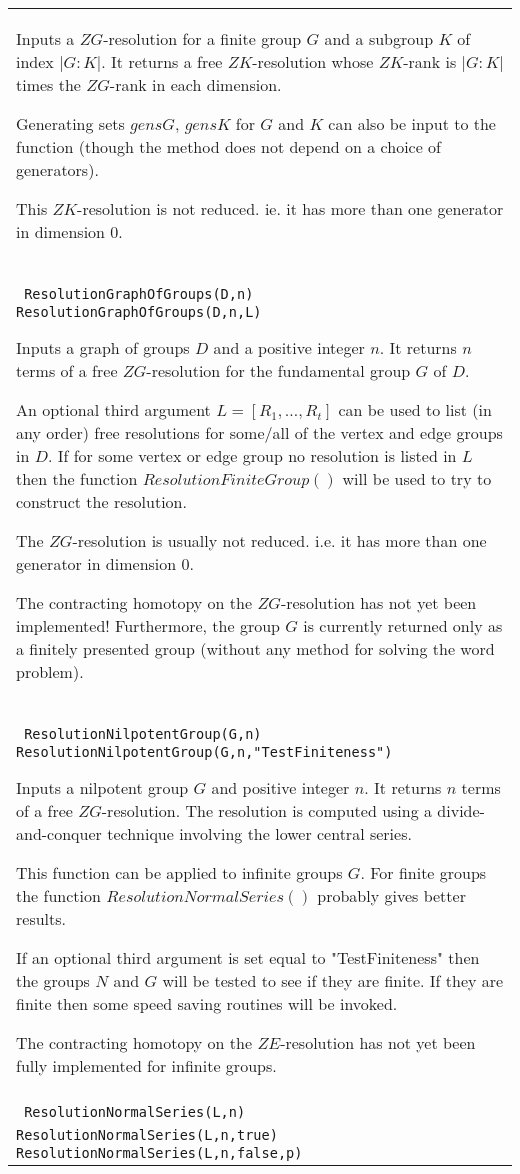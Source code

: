 \documentclass[a4paper,11pt]{report}
\begin{document}
{\begin{center}
\begin{tabular}{|l|}
 Inputs a $ZG$-resolution for a finite group $G$ and a subgroup $K$ of index $|G:K|$. It returns a free $ZK$-resolution whose $ZK$-rank is $|G:K|$ times the $ZG$-rank in each dimension.

 Generating sets $gensG$, $gensK$ for $G$ and $K$ can also be input to the function (though the method does not depend on a
choice of generators).

 This $ZK$-resolution is not reduced. ie. it has more than one generator in dimension $0$. \\
 \index{ResolutionGraphOfGroups} \texttt{ ResolutionGraphOfGroups(D,n) } {\nobreakspace} \texttt{ ResolutionGraphOfGroups(D,n,L) } 

 Inputs a graph of groups $D$ and a positive integer $n$. It returns $n$ terms of a free $ZG$-resolution for the fundamental group $G$ of $D$.

 An optional third argument $L=[R_1 , \ldots , R_t]$ can be used to list (in any order) free resolutions for some/all of the vertex
and edge groups in $D$. If for some vertex or edge group no resolution is listed in $L$ then the function $ResolutionFiniteGroup()$ will be used to try to construct the resolution. 

 The $ZG$-resolution is usually not reduced. i.e. it has more than one generator in
dimension 0.

 The contracting homotopy on the $ZG$-resolution has not yet been implemented! Furthermore, the group $G$ is currently returned only as a finitely presented group (without any method
for solving the word problem). \\
 \index{ResolutionNilpotentGroup} \texttt{ ResolutionNilpotentGroup(G,n) } {\nobreakspace} \texttt{ ResolutionNilpotentGroup(G,n,"TestFiniteness")} 

 Inputs a nilpotent group $G$ and positive integer $n$. It returns $n$ terms of a free $ZG$-resolution. The resolution is computed using a divide-and-conquer technique
involving the lower central series.

 This function can be applied to infinite groups $G$. For finite groups the function $ResolutionNormalSeries()$ probably gives better results.

 If an optional third argument is set equal to "TestFiniteness" then the groups $N$ and $G$ will be tested to see if they are finite. If they are finite then some speed
saving routines will be invoked.

 The contracting homotopy on the $ZE$-resolution has not yet been fully implemented for infinite groups. \\
 \index{ResolutionNormalSeries} \texttt{ ResolutionNormalSeries(L,n) } {\nobreakspace} \texttt{ ResolutionNormalSeries(L,n,true)} {\nobreakspace} \texttt{ ResolutionNormalSeries(L,n,false,p)} 


\end{tabular}
\end{center}}
\end{document}
